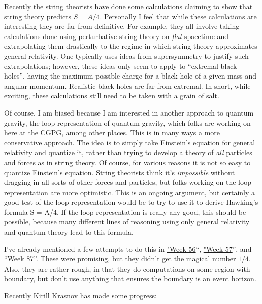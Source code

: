 \documentclass{article}
\def\tightlist{}
\renewcommand{\texttt}[1]{%
  \begingroup
  \ttfamily
  \begingroup\lccode`~=`/\lowercase{\endgroup\def~}{/\discretionary{}{}{}}%
  \begingroup\lccode`~=`[\lowercase{\endgroup\def~}{[\discretionary{}{}{}}%
  \begingroup\lccode`~=`.\lowercase{\endgroup\def~}{.\discretionary{}{}{}}%
  \catcode`/=\active\catcode`[=\active\catcode`.=\active
  \scantokens{#1\noexpand}%
  \endgroup
}
\begin{document}
Recently the string theorists have done some calculations claiming to
show that string theory predicts \(S = A/4\). Personally I feel that
while these calculations are interesting they are far from definitive.
For example, they all involve taking calculations done using
perturbative string theory on \emph{flat} spacetime and extrapolating
them drastically to the regime in which string theory approximates
general relativity. One typically uses ideas from supersymmetry to
justify such extrapolations; however, these ideas only seem to apply to
``extremal black holes'', having the maximum possible charge for a black
hole of a given mass and angular momentum. Realistic black holes are far
from extremal. In short, while exciting, these calculations still need
to be taken with a grain of salt.

Of course, I am biased because I am interested in another approach to
quantum gravity, the loop representation of quantum gravity, which folks
are working on here at the CGPG, among other places. This is in many
ways a more conservative approach. The idea is to simply take Einstein's
equation for general relativity and quantize it, rather than trying to
develop a theory of \emph{all} particles and forces as in string theory.
Of course, for various reasons it is not so easy to quantize Einstein's
equation. String theorists think it's \emph{impossible} without dragging
in all sorts of other forces and particles, but folks working on the
loop representation are more optimistic. This is an ongoing argument,
but certainly a good test of the loop representation would be to try to
use it to derive Hawking's formula S = A/4. If the loop representation
is really any good, this should be possible, because many different
lines of reasoning using only general relativity and quantum theory lead
to this formula.

I've already mentioned a few attempts to do this in
\protect\hyperlink{week56}{"Week 56}``, \protect\hyperlink{week57}{"Week
57}'', and \protect\hyperlink{week87}{``Week 87''}. These were
promising, but they didn't get the magical number \(1/4\). Also, they
are rather rough, in that they do computations on some region with
boundary, but don't use anything that ensures the boundary is an event
horizon.

Recently Kirill Krasnov has made some progress:

\end{document}
